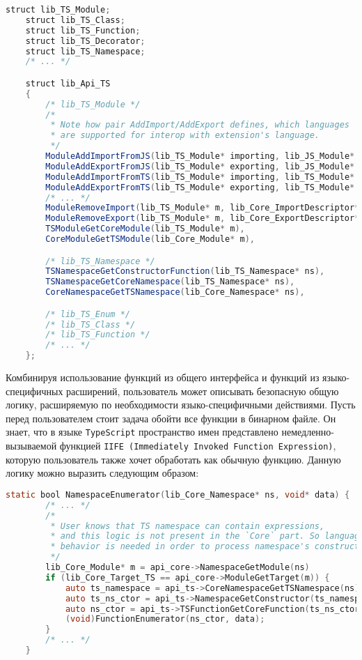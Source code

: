 \begin{lstlisting}[language=Java, caption=Примерный код расширения \texttt{Typescript}., label=lst:libTsExtension]
    struct lib_TS_Module;
    struct lib_TS_Class;
    struct lib_TS_Function;
    struct lib_TS_Decorator;
    struct lib_TS_Namespace;
    /* ... */

    struct lib_Api_TS
    {
        /* lib_TS_Module */
        /*
         * Note how pair AddImport/AddExport defines, which languages
         * are supported for interop with extension's language.
         */
        ModuleAddImportFromJS(lib_TS_Module* importing, lib_JS_Module* imported, ... payload);
        ModuleAddExportFromJS(lib_TS_Module* exporting, lib_JS_Module* exported, ... payload);
        ModuleAddImportFromTS(lib_TS_Module* importing, lib_TS_Module* imported, ... payload);
        ModuleAddExportFromTS(lib_TS_Module* exporting, lib_TS_Module* exported, ... payload);
        /* ... */
        ModuleRemoveImport(lib_TS_Module* m, lib_Core_ImportDescriptor* id);
        ModuleRemoveExport(lib_TS_Module* m, lib_Core_ExportDescriptor* ed);
        TSModuleGetCoreModule(lib_TS_Module* m),
        CoreModuleGetTSModule(lib_Core_Module* m),

        /* lib_TS_Namespace */
        TSNamespaceGetConstructorFunction(lib_TS_Namespace* ns),
        TSNamespaceGetCoreNamespace(lib_TS_Namespace* ns),
        CoreNamespaceGetTSNamespace(lib_Core_Namespace* ns),

        /* lib_TS_Enum */
        /* lib_TS_Class */
        /* lib_TS_Function */
        /* ... */
    };
\end{lstlisting}

Комбинируя использование функций из общего интерфейса и функций из языко-специфичных расширений, пользователь может описывать безопасную общую логику, расширяемую по необходимости языко-специфичными действиями. Пусть перед пользователем стоит задача обойти все функции в бинарном файле. Он знает, что в языке \texttt{TypeScript} пространство имен представлено немедленно-вызываемой функцией \texttt{IIFE~(Immediately~Invoked~Function~Expression)}, которую пользователь также хочет обработать как обычную функцию. Данную логику можно выразить следующим образом:

\begin{lstlisting}[language=C, label=lst:getTsNamespace]
    static bool NamespaceEnumerator(lib_Core_Namespace* ns, void* data) {
        /* ... */
        /*
         * User knows that TS namespace can contain expressions,
         * and this logic is not present in the `Core` part. So language-specific
         * behavior is needed in order to process namespace's constructor.
         */
        lib_Core_Module* m = api_core->NamespaceGetModule(ns)
        if (lib_Core_Target_TS == api_core->ModuleGetTarget(m)) {
            auto ts_namespace = api_ts->CoreNamespaceGetTSNamespace(ns);
            auto ts_ns_ctor = api_ts->NamespaceGetConstructor(ts_namespace);
            auto ns_ctor = api_ts->TSFunctionGetCoreFunction(ts_ns_ctor);
            (void)FunctionEnumerator(ns_ctor, data);
        }
        /* ... */
    }
\end{lstlisting}


